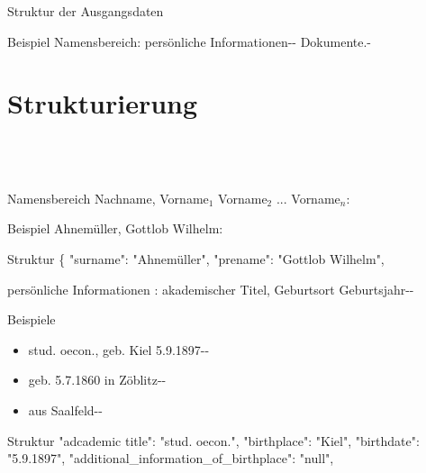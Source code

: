 \documentclass[12pt]{beamer}
\begin{document}
\begin{large}
\begin{frame}{Struktur der Ausgangsdaten}
 \vspace*{\fill}
 \begin{block}{Beispiel}
 \normalsize Namensbereich: persönliche Informationen-{}- Dokumente.-
 \end{block}
\end{frame} 


\section{Strukturierung}
 \subsection*{~}
 
\begin{frame}{Namensbereich}
 Nachname, Vorname$_1$ Vorname$_2$ ... Vorname$_n$:

 \vspace*{\fill}
 \begin{block}{Beispiel}
 \normalsize Ahnemüller, Gottlob Wilhelm:
 \end{block}

 \begin{block}{Struktur}
  \normalsize
  \{
  \newline
  \hspace*{0.5cm}
  "{}surname"{}: "{}Ahnemüller"{},
  \newline
  \hspace*{0.5cm}    
  "{}prename"{}: "{}Gottlob Wilhelm"{},
 \end{block} 
\end{frame}


\begin{frame}{persönliche Informationen}
 : akademischer Titel, Geburtsort Geburtsjahr-{}-

 \vspace*{\fill}
 \begin{block}{Beispiele}
  \normalsize
  \begin{itemize}
   \item stud. oecon., geb. Kiel 5.9.1897-{}-
   \item geb. 5.7.1860 in  Zöblitz-{}-
   \item aus Saalfeld-{}-
  \end{itemize}
 \end{block}
 
 \begin{block}{Struktur}
  \normalsize
  \hspace*{0.5cm}
  "{}adcademic title"{}: "{}stud. oecon."{},
  \newline 
  \hspace*{0.5cm}    
  "{}birthplace"{}: "{}Kiel"{},
  \newline
  \hspace*{0.5cm}
  "{}birthdate"{}: "{}5.9.1897"{},    
  \newline
  \hspace*{0.5cm}
  "{}additional\_information\_of\_birthplace"{}: "{}null"{},
 \end{block} 
\end{frame}


\end{large}
\end{document}
